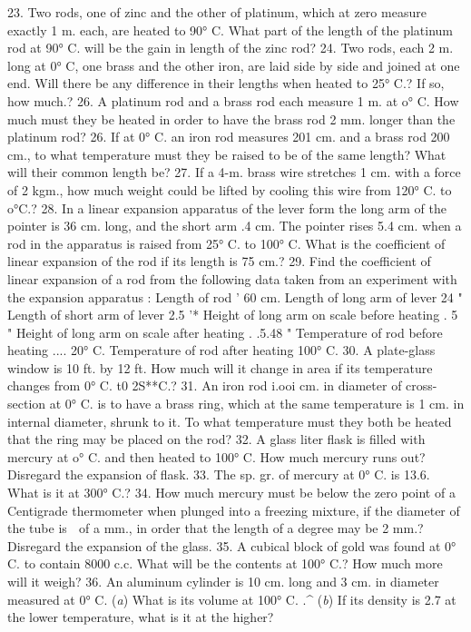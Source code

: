 23. Two rods, one of zinc and the other of platinum, which at zero measure exactly 1 m. each, are heated to 90° C. What part of the length of the platinum rod at 90° C. will be the gain in length of the zinc rod?
24. Two rods, each 2 m. long at 0° C, one brass and the other iron, are laid side by side and joined at one end. Will there be any difference in their lengths when heated to 25° C.? If so, how much.?
26. A platinum rod and a brass rod each measure 1 m. at o° C. How much must they be heated in order to have the brass rod 2 mm. longer than the platinum rod?
26. If at 0° C. an iron rod measures 201 cm. and a brass rod 200 cm., to what temperature must they be raised to be of the same length? What will their common length be?
27. If a 4-m. brass wire stretches 1 cm. with a force of 2 kgm., how much weight could be lifted by cooling this wire from 120° C. to o°C.?
28. In a linear expansion apparatus of the lever form the long arm of the pointer is 36 cm. long, and the short arm .4 cm. The pointer rises 5.4 cm. when a rod in the apparatus is raised from 25° C. to 100° C. What is the coefficient of linear expansion of the rod if its length is 75 cm.?
29. Find the coefficient of linear expansion of a rod from the following data taken from an experiment with the expansion apparatus :
Length of rod ' 60 cm.
Length of long arm of lever 24 "
Length of short arm of lever 2.5 '*
Height of long arm on scale before heating . 5 " Height of long arm on scale after heating . .5.48 "
Temperature of rod before heating .... 20° C.
Temperature of rod after heating 100° C.
30. A plate-glass window is 10 ft. by 12 ft. How much will it change in area if its temperature changes from 0° C. t0 2S**C.?
31. An iron rod i.ooi cm. in diameter of cross-section at 0° C. is to have a brass ring, which at the same temperature is 1 cm. in internal diameter, shrunk to it. To what temperature must they both be heated that the ring may be placed on the rod?
32. A glass liter flask is filled with mercury at o° C. and then heated to 100° C. How much mercury runs out? Disregard the expansion of flask.
33. The sp. gr. of mercury at 0° C. is 13.6. What is it at 300° C.?
34. How much mercury must be below the zero point of a Centigrade thermometer when plunged into a freezing mixture, if the diameter of the tube is ^^^ of a mm., in order that the length of a degree may be 2 mm.? Disregard the expansion of the glass.
35. A cubical block of gold was found at 0° C. to contain 8000 c.c. What will be the contents at 100° C.? How much more will it weigh?
36. An aluminum cylinder is 10 cm. long and 3 cm. in diameter measured at 0° C. (\emph{a}) What is its volume at 100° C. .^ (\emph{b}) If its density is 2.7 at the lower temperature, what is it at the higher?

